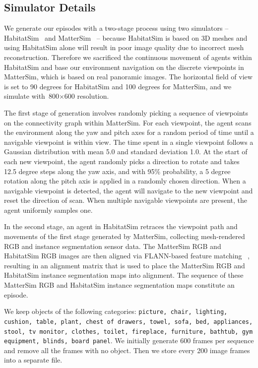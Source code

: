 

\subsection{\ourroom{} Simulator Details}
We generate our episodes with a two-stage process using two simulators -- HabitatSim~\citep{habitat}
and MatterSim~\citep{mattersim} -- because HabitatSim is based on 3D meshes and using HabitatSim
alone will result in poor image quality due to incorrect mesh reconstruction. Therefore we
sacrificed the continuous movement of agents within HabitatSim and base our environment navigation
on the discrete viewpoints in MatterSim, which is based on real panoramic images. The horizontal
field of view is set to 90 degrees for HabitatSim and 100 degrees for MatterSim, and we simulate
with\ 800$\times$600 resolution.

The first stage of generation involves randomly picking a sequence of viewpoints on the connectivity
graph within MatterSim. For each viewpoint, the agent scans the environment along the yaw and pitch
axes for a random period of time until a navigable viewpoint is within view. The time spent in a
single viewpoint follows a Gaussian distribution with mean 5.0 and standard deviation 1.0. At the
start of each new viewpoint, the agent randomly picks a direction to rotate and takes 12.5 degree
steps along the yaw axis, and with 95\% probability, a 5 degree rotation along the pitch axis is
applied in a randomly chosen direction. When a navigable viewpoint is detected, the agent will
navigate to the new viewpoint and reset the direction of scan. When multiple navigable viewpoints
are present, the agent uniformly samples one.

In the second stage, an agent in HabitatSim retraces the viewpoint path and movements of the first
stage generated by MatterSim, collecting mesh-rendered RGB and instance segmentation sensor data.
The MatterSim RGB and HabitatSim RGB images are then aligned via FLANN-based feature matching
~\citep{muja2009flann}, resulting in an alignment matrix that is used to place the MatterSim RGB and
HabitatSim instance segmentation maps into alignment. The sequence of these MatterSim RGB and
HabitatSim instance segmentation maps constitute an episode.

We keep objects of the following categories: \texttt{picture, chair, lighting, cushion, table,
plant, chest of drawers, towel, sofa, bed, appliances, stool, tv monitor, clothes, toilet,
fireplace, furniture, bathtub, gym equipment, blinds, board panel}. We initially generate 600 frames
per sequence and remove all the frames with no object. Then we store every 200 image frames into a
separate file.

